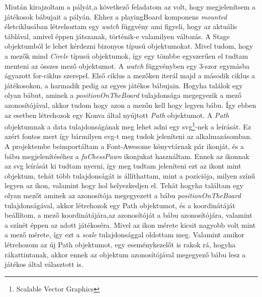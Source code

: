 \documentclass[a4paper,twoside]{article}
\begin{document}
Miután kirajzoltam a pályát,a következő feladatom az volt, hogy megjelenítsem a játékosok bábujait a pályán. Ehhez a playingBoard komponens \textit{mounted} életciklusában létrehoztam egy \textit{watch} függvény ami figyeli, hogy az aktuális táblával, amivel éppen játszanak, történik-e valamilyen változás. A Stage objektumból le lehet kérdezni bizonyos típusú objektumokat. Mivel tudom, hogy a mezők mind \textit{Circle} típusú objektumok, így egy tömbbe egyszerűen el tudtam menteni az összes mező objektumot. A \textit{watch} függvényben egy 3-szor egymásba ágyazott for-ciklus szerepel. Első ciklus a mezőken iterál majd a második ciklus a játékosokon, a harmadik pedig az egyes játékos bábujain. Hogyha találok egy olyan bábut, aminek a \textit{positionOnTheBoard} tulajdonsága megegyezik a mező azonosítójával, akkor tudom hogy azon a mezőn kell hogy legyen bábu. Így ebben az esetben létrehozok egy Konva által nyújtott \textit{Path} objektumot. A \textit{Path} objektumnak a data tulajdonságának meg lehet adni egy svg\footnote{Scalable Vector Graphics}-nek a leírását. Ez azért fontos mert így bármilyen svg-t meg tudok jeleníteni az alkalmazásomban. A projektembe beimportáltam a Font-Awesome könyvtárnak pár ikonját, és a bábu megjelenítéséhez a \textit{faChessPawn} ikonjukat használtam. Ennek az ikonnak az svg leírását ki tudtam nyerni, így meg tudtam jeleníteni ezt az ikont mint objektum, tehát több tulajdonságát is állíthattam, mint a pozíciója, milyen színű legyen az ikon, valamint hogy hol helyezkedjen el. Tehát hogyha találtam egy olyan mezőt aminek az azonosítója megegyezett a bábu \textit{positionOnTheBoard} tulajdonságával, akkor létrehozok egy Path objektumot, és a koordinátáját beállítom, a mező koordinátájára,az azonosítóját a bábu azonosítójára, valamint a színét éppen az adott játékoséra. Mivel az ikon mérete kicsit nagyobb volt mint a mező mérete, így ezt a \textit{scale} tulajdonsággal oldottam meg. Valamint amikor létrehozom az új Path objektumot, egy eseménykezelőt is rakok rá, hogyha rákattintanak, akkor ennek az objektum azonosítójával megegyező bábu lesz a játékos által választott is. 
\end{document}
